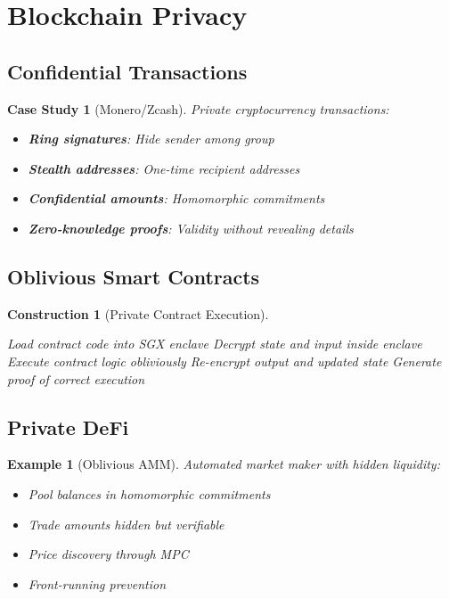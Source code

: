\documentclass[11pt,final]{article}
\newtheorem{example}[theorem]{Example}
\newtheorem{construction}[theorem]{Construction}
\newtheorem{casestudy}[theorem]{Case Study}
\begin{document}
\section{Blockchain Privacy}

\subsection{Confidential Transactions}

\begin{casestudy}[Monero/Zcash]
Private cryptocurrency transactions:
\begin{itemize}
    \item \textbf{Ring signatures}: Hide sender among group
    \item \textbf{Stealth addresses}: One-time recipient addresses
    \item \textbf{Confidential amounts}: Homomorphic commitments
    \item \textbf{Zero-knowledge proofs}: Validity without revealing details
\end{itemize}
\end{casestudy}

\subsection{Oblivious Smart Contracts}

\begin{construction}[Private Contract Execution]
\begin{algorithm}[H]
\caption{Oblivious Smart Contract}
Load contract code into SGX enclave\;
Decrypt state and input inside enclave\;
Execute contract logic obliviously\;
Re-encrypt output and updated state\;
Generate proof of correct execution\;
\end{algorithm}
\end{construction}

\subsection{Private DeFi}

\begin{example}[Oblivious AMM]
Automated market maker with hidden liquidity:
\begin{itemize}
    \item Pool balances in homomorphic commitments
    \item Trade amounts hidden but verifiable
    \item Price discovery through MPC
    \item Front-running prevention
\end{itemize}
\end{example}
\end{document}
